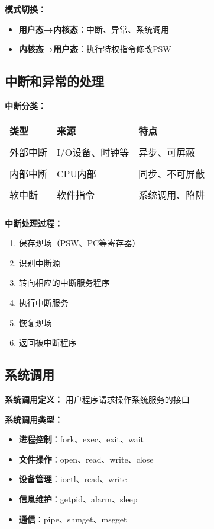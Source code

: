 \documentclass[lang=cn,newtx,10pt,scheme=chinese]{../../elegantbook}
\begin{document}
\textbf{模式切换：}
\begin{itemize}
  \item \textbf{用户态→内核态}：中断、异常、系统调用
  \item \textbf{内核态→用户态}：执行特权指令修改PSW
\end{itemize}

\subsection{中断和异常的处理}

\textbf{中断分类：}
\begin{longtable}{@{}p{3cm}p{4cm}p{6cm}@{}}
\toprule
\textbf{类型} & \textbf{来源} & \textbf{特点} \\\\ \midrule
\endhead

外部中断 & I/O设备、时钟等 & 异步、可屏蔽 \\\\
内部中断 & CPU内部 & 同步、不可屏蔽 \\\\
软中断 & 软件指令 & 系统调用、陷阱 \\\\

\bottomrule
\end{longtable}

\textbf{中断处理过程：}
\begin{enumerate}
  \item 保存现场（PSW、PC等寄存器）
  \item 识别中断源
  \item 转向相应的中断服务程序
  \item 执行中断服务
  \item 恢复现场
  \item 返回被中断程序
\end{enumerate}

\subsection{系统调用}

\textbf{系统调用定义：}
用户程序请求操作系统服务的接口

\textbf{系统调用类型：}
\begin{itemize}
  \item \textbf{进程控制}：fork、exec、exit、wait
  \item \textbf{文件操作}：open、read、write、close
  \item \textbf{设备管理}：ioctl、read、write
  \item \textbf{信息维护}：getpid、alarm、sleep
  \item \textbf{通信}：pipe、shmget、msgget
\end{itemize}
\end{document}
